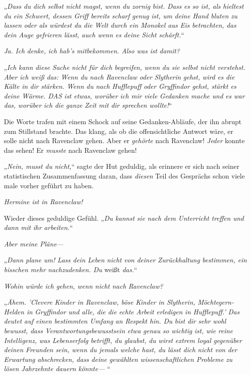 {„\emph{Dass du dich selbst nicht magst, wenn du zornig bist. Dass es so ist, als hieltest du ein Schwert, dessen Griff bereits scharf genug ist, um deine Hand bluten zu lassen oder als würdest du die Welt durch ein Monokel aus Eis betrachten, das dein Auge gefrieren lässt, auch wenn es deine Sicht schärft.}“

\emph{Ja. Ich denke, ich hab's mitbekommen. Also was ist damit?}

„\emph{Ich kann diese Sache nicht für dich begreifen, wenn du sie selbst nicht verstehst. Aber ich weiß das: Wenn du nach Ravenclaw oder Slytherin} \emph{gehst, wird es die Kälte in dir stärken. Wenn du nach Hufflepuff oder Gryffindor gehst, stärkt es deine Wärme. DAS ist etwas, worüber ich mir viele Gedanken mache und es war das, worüber ich die ganze Zeit mit dir sprechen wollte!}“

Die Worte trafen mit einem Schock auf seine Gedanken-Abläufe, der ihn abrupt zum Stillstand brachte. Das klang, als ob die offensichtliche Antwort wäre, er solle nicht nach Ravenclaw gehen. Aber er \emph{gehörte} nach Ravenclaw! \emph{Jeder} konnte das sehen! Er \emph{musste} nach Ravenclaw gehen!

„\emph{Nein, musst du nicht,}“ sagte der Hut geduldig, als erinnere er sich nach seiner statistischen Zusammenfassung daran, dass \emph{diesen} Teil des Gesprächs schon viele male vorher geführt zu haben.

\emph{Hermine ist in Ravenclaw!}

Wieder dieses geduldige Gefühl. „\emph{Du kannst sie nach dem Unterricht treffen und dann mit ihr arbeiten.}“

\emph{Aber meine Pläne—}

„\emph{Dann plane um! Lass dein Leben nicht von deiner Zurückhaltung bestimmen, ein bisschen mehr nachzudenken. Du} weißt \emph{das.}“

\emph{Wohin würde ich gehen, wenn nicht nach Ravenclaw?}

„\emph{Ähem. 'Clevere Kinder in Ravenclaw, böse Kinder in Slytherin, Möchtegern-Helden in Gryffindor und alle, die die echte Arbeit erledigen in Hufflepuff.' Das deutet auf einen bestimmten Umfang an Respekt hin. Du bist dir sehr wohl bewusst, dass Verantwortungsbewusstsein etwa genau so wichtig ist, wie reine Intelligenz, was Lebenserfolg betrifft, du glaubst, du wirst extrem loyal gegenüber deinen Freunden sein, wenn du jemals welche hast, du lässt dich nicht von der Erwartung abschrecken, dass deine gewählten wissenschaftlichen Probleme zu lösen Jahrzehnte dauern könnte—} “

}

